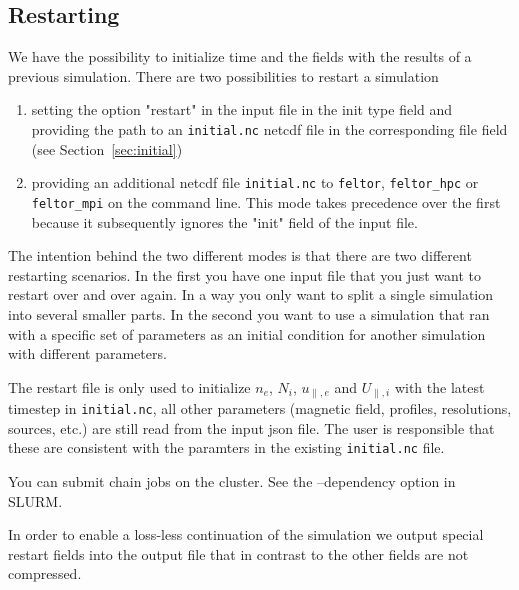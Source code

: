 \subsection{Restarting} \label{sec:restart}
We have the possibility to initialize time and
the fields with the results of a previous simulation.
There are two possibilities to restart a simulation
\begin{enumerate}
    \item setting the option "restart" in the input file in the init type field
        and providing the path to an \texttt{initial.nc} netcdf file in the
        corresponding file field (see Section~\ref{sec:initial})
    \item providing an additional netcdf file \texttt{initial.nc}
        to \texttt{feltor}, \texttt{feltor_hpc} or \texttt{feltor_mpi} on the
        command line. This mode takes precedence over the first because it
        subsequently ignores the "init" field of the input file.
\end{enumerate}
The intention behind the two different modes is that there are two different
restarting scenarios. In the first you have one input file that you just want
to restart over and over again. In a way you only want to split a single
simulation into several smaller parts. In the second you want to use a
simulation that ran with a specific set of parameters as an initial condition
for another simulation with different parameters.
\begin{tcolorbox}[title=Note]
    The restart file is only used to initialize $n_e$, $N_i$, $u_{\parallel,e}$
    and $U_{\parallel,i}$ with the latest timestep in \texttt{initial.nc}, all
    other parameters (magnetic field, profiles, resolutions, sources, etc.)
    are still read from the input json file.  The user is responsible
    that these are consistent with the paramters in the existing
    \texttt{initial.nc} file.
\end{tcolorbox}

\begin{tcolorbox}[title=Note]
    You can submit chain jobs on the cluster. See the --dependency option in SLURM.
\end{tcolorbox}
\begin{tcolorbox}[title=Note]
In order to enable a
loss-less continuation of the simulation we output special restart fields into
the output file that in contrast to the other fields are not compressed.
\end{tcolorbox}


